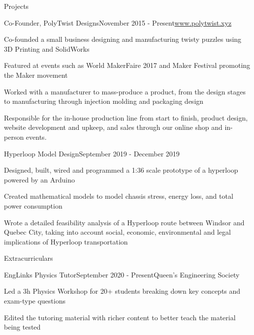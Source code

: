 \documentclass{resume} %
\begin{document}
\begin{rSection}{Projects}

\begin{rSubsection}{Co-Founder, PolyTwist Designs}{November 2015 - Present}{\url{www.polytwist.xyz}}{}
\item Co-founded a small business designing and manufacturing twisty puzzles using 3D Printing and SolidWorks
\item Featured at events such as World MakerFaire 2017 and Maker Festival promoting the Maker movement
\item Worked with a manufacturer to mass-produce a product, from the design stages to manufacturing through injection molding and packaging design
\item Responsible for the in-house production line from start to finish, product design, website development and upkeep, and sales through our online shop and in-person events.
\end{rSubsection}

\begin{rSubsection}{Hyperloop Model Design}{September 2019 - December 2019}{}{}
\item Designed, built, wired and programmed a 1:36 scale prototype of a hyperloop powered by an Arduino
\item Created mathematical models to model chassis stress, energy loss, and total power consumption
\item Wrote a detailed feasibility analysis of a Hyperloop route between Windsor and Quebec City, taking into account social, economic, environmental and legal implications of Hyperloop transportation
\end{rSubsection}


\end{rSection}



\begin{rSection}{Extracurriculars}
\begin{rSubsection}{EngLinks Physics Tutor}{September 2020 - Present}{Queen's Engineering Society}{}
\item Led a 3h Physics Workshop for 20+ students breaking down key concepts and exam-type questions
\item Edited the tutoring material with richer content to better teach the material being tested

\end{rSubsection}

\end{rSection}
\end{document}
